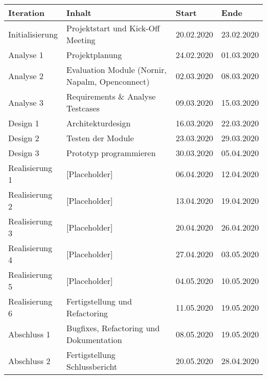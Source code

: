 \documentclass[
	ngerman,
	toc=listof, %
	toc=bibliography, %
	footnotes=multiple, %
	parskip=half, %
	numbers=noendperiod %
]{scrartcl}
\begin{document}
		\begin{tabularx}{\textwidth}{lXll}
			\toprule
			Iteration & Inhalt & Start & Ende \\
			\midrule
			Initialisierung & Projektstart und Kick-Off Meeting & 20.02.2020 & 23.02.2020 \\
			Analyse 1 & Projektplanung & 24.02.2020 & 01.03.2020 \\
			Analyse 2 & Evaluation Module (Nornir, Napalm, Openconnect) & 02.03.2020 & 08.03.2020 \\
			Analyse 3 & Requirements \& Analyse Testcases & 09.03.2020 & 15.03.2020 \\
			Design 1 & Architekturdesign & 16.03.2020 & 22.03.2020 \\
			Design 2 & Testen der Module & 23.03.2020 & 29.03.2020 \\
			Design 3 & Prototyp programmieren & 30.03.2020 & 05.04.2020 \\
			Realisierung 1 & [Placeholder] & 06.04.2020 & 12.04.2020 \\
			Realisierung 2 & [Placeholder] & 13.04.2020 & 19.04.2020 \\
			Realisierung 3 & [Placeholder] & 20.04.2020 & 26.04.2020 \\
			Realisierung 4 & [Placeholder] & 27.04.2020 & 03.05.2020 \\
			Realisierung 5 & [Placeholder] & 04.05.2020 & 10.05.2020 \\
			Realisierung 6 & Fertigstellung und Refactoring & 11.05.2020 & 19.05.2020 \\
			Abschluss 1 & Bugfixes, Refactoring und Dokumentation & 08.05.2020 & 19.05.2020\\
			Abschluss 2 & Fertigstellung Schlussbericht & 20.05.2020 & 28.04.2020\\
			\bottomrule
		\end{tabularx}
\end{document}
